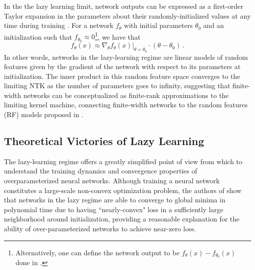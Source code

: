 \documentclass[11pt]{article}
\begin{document}
In the the lazy learning limit, network outputs can be expressed as a first-order Taylor expansion in the parameters about their randomly-initialized values at any time during training \cite{leeWideNeuralNetworks2019}. For a network $f_\theta$ with initial parameters $\theta_0$ and an initialization such that $f_{\theta_0} \approx 0$\footnote{Alternatively, one can define the network output to be $f_{\theta}(x) - f_{\theta_0}(x)$ done in \cite{chizatLazyTrainingDifferentiable2020}.}, we have that
\begin{equation}
    f_\theta(x) \approx \nabla_\theta \left.f_\theta(x)\right|_{\theta=\theta_0} \cdot (\theta - \theta_0)\,.
    \label{lazylinear}
\end{equation}
In other words, networks in the lazy-learning regime are linear models of random features given by the gradient of the network with respect to its parameters at initialization. The inner product in this random feature space converges to the limiting NTK as the number of parameters goes to infinity, suggesting that finite-width networks can be conceptualized as finite-rank approximations to the limiting kernel machine, connecting finite-width networks to the random features (RF) models proposed in \cite{rahimiRandomFeaturesLargeScale2008}.

\subsection{Theoretical Victories of Lazy Learning}

The lazy-learning regime offers a greatly simplified point of view from which to understand the training dynamics and convergence properties of overparameterized neural networks. Although training a neural network constitutes a large-scale non-convex optimization problem, the authors of \cite{allen-zhuConvergenceTheoryDeep2019} show that networks in the lazy regime are able to converge to global minima in polynomial time due to having ``nearly-convex" loss in a sufficiently large neighborhood around initialization, providing a reasonable explanation for the ability of over-parameterized networks to achieve near-zero loss.\\
\end{document}
